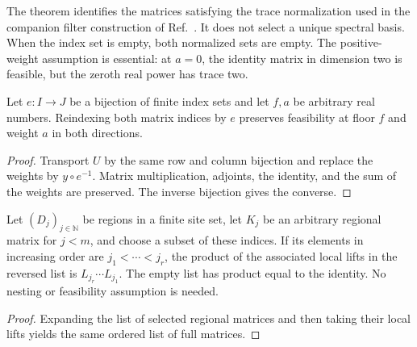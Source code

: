 The theorem identifies the matrices satisfying the trace normalization
used in the companion filter construction of
Ref.~\cite{OpenAI2026PEPSFiltersEnergy}. It does not select a unique
spectral basis. When the index set is empty, both normalized sets are
empty. The positive-weight assumption is essential: at $a=0$, the
identity matrix in dimension two is feasible, but the zeroth real power
has trace two.

\begin{theorem}
    \label{thm:feasible_filter_reindex}
    \leanok
    Let $e:I\to J$ be a bijection of finite index sets and let $f,a$ be
    arbitrary real numbers. Reindexing both matrix indices by $e$
    preserves feasibility at floor $f$ and weight $a$ in both directions.
\end{theorem}
\begin{proof}
    \leanok
    Transport $U$ by the same row and column bijection and replace the
    weights by $y\circ e^{-1}$. Matrix multiplication, adjoints, the
    identity, and the sum of the weights are preserved. The inverse
    bijection gives the converse.
\end{proof}

\begin{theorem}
    \label{thm:selected_filter_product}
    \leanok
    Let $(D_j)_{j\in\mathbb N}$ be regions in a finite site set, let
    $K_j$ be an arbitrary regional matrix for $j<m$, and choose a subset
    of these indices. If its elements in increasing order are
    $j_1<\cdots<j_r$, the product of the associated local lifts in the
    reversed list is $L_{j_r}\cdots L_{j_1}$. The empty list has product
    equal to the identity. No nesting or feasibility assumption is needed.
\end{theorem}
\begin{proof}
    \leanok
    Expanding the list of selected regional matrices and then taking
    their local lifts yields the same ordered list of full matrices.
\end{proof}

